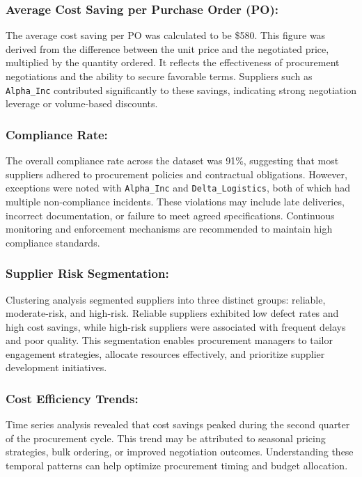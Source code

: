 \documentclass[10pt, twocolumn]{article}
\begin{document}
\subsubsection{Average Cost Saving per Purchase Order (PO):} The average cost saving per PO was calculated to be \$580. This figure was derived from the difference between the unit price and the negotiated price, multiplied by the quantity ordered. It reflects the effectiveness of procurement negotiations and the ability to secure favorable terms. Suppliers such as \texttt{Alpha\_Inc} contributed significantly to these savings, indicating strong negotiation leverage or volume-based discounts.

\subsubsection{Compliance Rate:} The overall compliance rate across the dataset was 91\%, suggesting that most suppliers adhered to procurement policies and contractual obligations. However, exceptions were noted with \texttt{Alpha\_Inc} and \texttt{Delta\_Logistics}, both of which had multiple non-compliance incidents. These violations may include late deliveries, incorrect documentation, or failure to meet agreed specifications. Continuous monitoring and enforcement mechanisms are recommended to maintain high compliance standards.

\subsubsection{Supplier Risk Segmentation:} Clustering analysis segmented suppliers into three distinct groups: reliable, moderate-risk, and high-risk. Reliable suppliers exhibited low defect rates and high cost savings, while high-risk suppliers were associated with frequent delays and poor quality. This segmentation enables procurement managers to tailor engagement strategies, allocate resources effectively, and prioritize supplier development initiatives.

\subsubsection{Cost Efficiency Trends:} Time series analysis revealed that cost savings peaked during the second quarter of the procurement cycle. This trend may be attributed to seasonal pricing strategies, bulk ordering, or improved negotiation outcomes. Understanding these temporal patterns can help optimize procurement timing and budget allocation.
\end{document}
